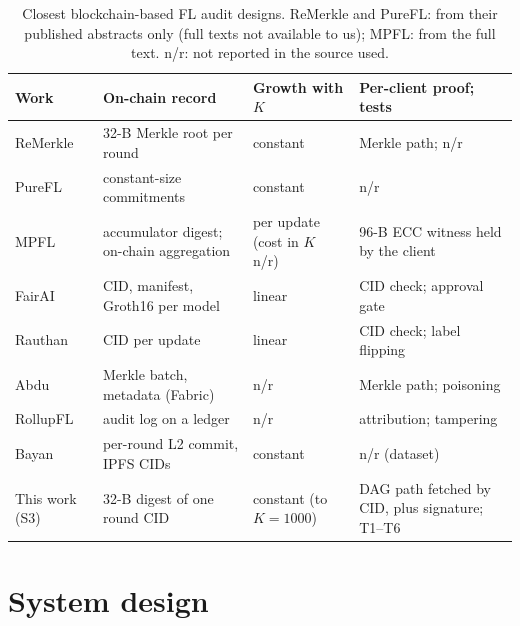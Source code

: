 \documentclass[final,3p,times,twocolumn]{elsarticle}
\begin{document}
\begin{table}[t]
\centering\scriptsize
\caption{Closest blockchain-based FL audit designs. ReMerkle and PureFL: from their published abstracts only (full texts not available to us); MPFL: from the full text. n/r: not reported in the source used.}
\label{tab:related}
\setlength{\tabcolsep}{2.5pt}
\begin{tabular}{@{}L{1.42cm}L{2.2cm}L{1.55cm}L{2.08cm}@{}}
\toprule
Work & On-chain record & Growth with $K$ & Per-client proof; tests\\
\midrule
ReMerkle~\cite{remerkle} & 32-B Merkle root per round & constant & Merkle path; n/r\\
PureFL~\cite{purefl} & constant-size commitments & constant & n/r\\
MPFL~\cite{mazzocca} & accumulator digest; on-chain aggregation & per update (cost in $K$ n/r) & 96-B ECC witness held by the client\\
FairAI~\cite{fairai} & CID, manifest, Groth16 per model & linear & CID check; approval gate\\
Rauthan~\cite{rauthan} & CID per update & linear & CID check; label flipping\\
Abdu~\cite{abdu} & Merkle batch, metadata (Fabric) & n/r & Merkle path; poisoning\\
RollupFL~\cite{rollupfl} & audit log on a ledger & n/r & attribution; tampering\\
Bayan~\cite{bayan} & per-round L2 commit, IPFS CIDs & constant & n/r (dataset)\\
\midrule
This work (S3) & 32-B digest of one round CID & constant (to $K=1000$) & DAG path fetched by CID, plus signature; T1--T6\\
\bottomrule
\end{tabular}
\end{table}

\section{System design}\label{sec:design}
\end{document}
